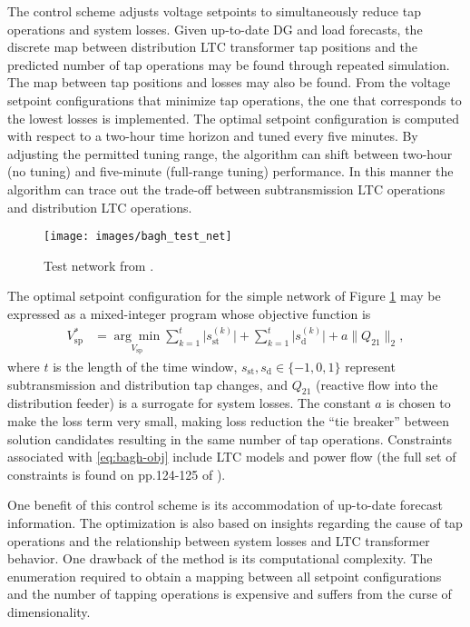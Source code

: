 \documentclass[10pt,letterpaper]{article}
\begin{document}
The control scheme adjusts voltage setpoints to simultaneously reduce tap operations and system losses. Given up-to-date DG and load forecasts, the discrete map between distribution LTC transformer tap positions and the predicted number of tap operations may be found through repeated simulation. The map between tap positions and losses may also be found. From the voltage setpoint configurations that minimize tap operations, the one that corresponds to the lowest losses is implemented. The optimal setpoint configuration is computed with respect to a two-hour time horizon and tuned every five minutes. By adjusting the permitted tuning range, the algorithm can shift between two-hour (no tuning) and five-minute (full-range tuning) performance. In this manner the algorithm can trace out the trade-off between subtransmission LTC operations and distribution LTC operations.
\begin{figure}[h!]
    \centering
    \texttt{[image: images/bagh\_test\_net]}
    \caption{Test network from \cite{baghsorkhi2015}.}
    \label{fig:bagh_test_net}
\end{figure}
The optimal setpoint configuration for the simple network of Figure \ref{fig:bagh_test_net} may be expressed as a mixed-integer program whose objective function is
\begin{align}\label{eq:bagh-obj}
V_\text{sp}^* &= \underset{V_\text{sp}}{\arg\min}\sum_{k=1}^{t} \lvert s_\text{st}^{(k)}\rvert + \sum_{k=1}^{t}\lvert s_\text{d}^{(k)}\rvert + a\lVert Q_{21}\rVert_2,
\end{align}
where $t$ is the length of the time window, $s_\text{st},s_\text{d}\in \{-1,0,1\}$ represent subtransmission and distribution tap changes, and $Q_{21}$ (reactive flow into the distribution feeder) is a surrogate for system losses. The constant $a$ is chosen to make the loss term very small, making loss reduction the ``tie breaker'' between solution candidates resulting in the same number of tap operations. Constraints associated with \eqref{eq:bagh-obj} include LTC models and power flow (the full set of constraints is found on pp.124-125 of \cite{baghsorkhi2015}).
 
One benefit of this control scheme is its accommodation of up-to-date forecast information. The optimization is also based on insights regarding the cause of tap operations and the relationship between system losses and LTC transformer behavior. One drawback of the method is its computational complexity. The enumeration required to obtain a mapping between all setpoint configurations and the number of tapping operations is expensive and suffers from the curse of dimensionality. 
\end{document}
